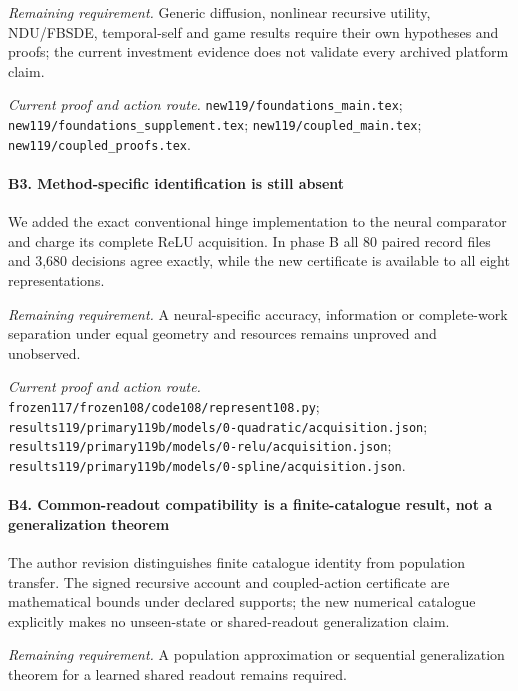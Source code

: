 \par\emph{Remaining requirement.} Generic diffusion, nonlinear recursive utility, NDU/\allowbreak{}FBSDE, temporal-self and game results require their own hypotheses and proofs; the current investment evidence does not validate every archived platform claim.

\par\emph{Current proof and action route.} \nolinkurl{new119/foundations_main.tex}; \nolinkurl{new119/foundations_supplement.tex}; \nolinkurl{new119/coupled_main.tex}; \nolinkurl{new119/coupled_proofs.tex}.

\paragraph{B3. Method-specific identification is still absent}

We added the exact conventional hinge implementation to the neural comparator and charge its complete ReLU acquisition. In phase B all 80 paired record files and 3,680 decisions agree exactly, while the new certificate is available to all eight representations.

\par\emph{Remaining requirement.} A neural-specific accuracy, information or complete-work separation under equal geometry and resources remains unproved and unobserved.

\par\emph{Current proof and action route.} \nolinkurl{frozen117/frozen108/code108/represent108.py}; \nolinkurl{results119/primary119b/models/0-quadratic/acquisition.json}; \nolinkurl{results119/primary119b/models/0-relu/acquisition.json}; \nolinkurl{results119/primary119b/models/0-spline/acquisition.json}.

\paragraph{B4. Common-readout compatibility is a finite-catalogue result, not a generalization theorem}

The author revision distinguishes finite catalogue identity from population transfer. The signed recursive account and coupled-action certificate are mathematical bounds under declared supports; the new numerical catalogue explicitly makes no unseen-state or shared-readout generalization claim.

\par\emph{Remaining requirement.} A population approximation or sequential generalization theorem for a learned shared readout remains required.

